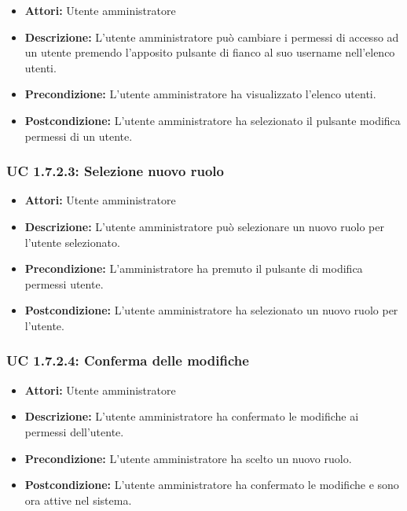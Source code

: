 \begin{itemize}
    \item \textbf{Attori:} Utente amministratore
    \item \textbf{Descrizione:} L'utente amministratore può cambiare i permessi di accesso ad un utente premendo l'apposito pulsante di fianco al suo username nell'elenco utenti.
    \item \textbf{Precondizione:} L'utente amministratore ha visualizzato l'elenco utenti.
    \item \textbf{Postcondizione:} L'utente amministratore ha selezionato il pulsante modifica permessi di un utente.
\end{itemize}

\subsubsection{UC 1.7.2.3: Selezione nuovo ruolo}

\begin{itemize}
    \item \textbf{Attori:} Utente amministratore
    \item \textbf{Descrizione:} L'utente amministratore può selezionare un nuovo ruolo per l'utente selezionato.
    \item \textbf{Precondizione:} L'amministratore ha premuto il pulsante di modifica permessi utente.
    \item \textbf{Postcondizione:} L'utente amministratore ha selezionato un nuovo ruolo per l'utente.
\end{itemize}

\subsubsection{UC 1.7.2.4: Conferma delle modifiche}

\begin{itemize}
    \item \textbf{Attori:} Utente amministratore
    \item \textbf{Descrizione:} L'utente amministratore ha confermato le modifiche ai permessi dell'utente.
    \item \textbf{Precondizione:} L'utente amministratore ha scelto un nuovo ruolo.
    \item \textbf{Postcondizione:} L'utente amministratore ha confermato le modifiche e sono ora attive nel sistema.
\end{itemize}

